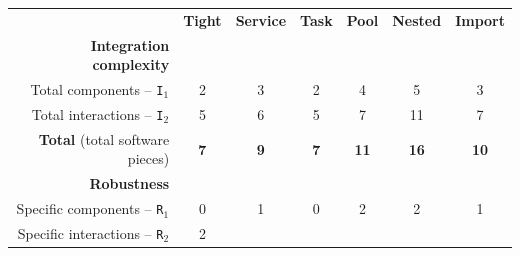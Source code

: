 \documentclass[preprint,3p,twocolumn]{elsarticle}
\begin{document}
\begin{table}
\footnotesize
\centering
\begin{tabular}{rcccccc}
                                     & \textbf{Tight}
                                     & \textbf{Service}
                                     & \textbf{Task}
                                     & \textbf{Pool}
                                     & \textbf{Nested}
                                     & \textbf{Import} \\
\cellcolor[HTML]{EEEEEE}\textbf{Integration complexity}& \multicolumn{6}{l}{\cellcolor[HTML]{EEEEEE}}\\
  Total components -- \texttt{I$_1$} & \cellcolor[HTML]{99FF99}2
                                     & \cellcolor[HTML]{99DD99}3
                                     & \cellcolor[HTML]{99FF99}2
                                     & \cellcolor[HTML]{99BB99}4
                                     & \cellcolor[HTML]{999999}5
                                     & \cellcolor[HTML]{99DD99}3\\
Total interactions -- \texttt{I$_2$} & \cellcolor[HTML]{99FF99}5
                                     & \cellcolor[HTML]{99EE99}6
                                     & \cellcolor[HTML]{99FF99}5
                                     & \cellcolor[HTML]{99DD99}7
                                     & \cellcolor[HTML]{999999}11
                                     & \cellcolor[HTML]{99DD99}7\\
\textbf{Total} (total software pieces) & \cellcolor[HTML]{99FF99}\textbf{7}
                                     & \cellcolor[HTML]{99E899}\textbf{9}
                                     & \cellcolor[HTML]{99FF99}\textbf{7}
                                     & \cellcolor[HTML]{99D299}\textbf{11}
                                     & \cellcolor[HTML]{999999}\textbf{16}
                                     & \cellcolor[HTML]{99DD99}\textbf{10}\\
\cellcolor[HTML]{EEEEEE}\textbf{Robustness}& \multicolumn{6}{l}{\cellcolor[HTML]{EEEEEE}}\\
Specific components -- \texttt{R$_1$} & \cellcolor[HTML]{99FF99}0
                                     & \cellcolor[HTML]{99CC99}1
                                     & \cellcolor[HTML]{99FF99}0
                                     & \cellcolor[HTML]{999999}2
                                     & \cellcolor[HTML]{999999}2
                                     & \cellcolor[HTML]{99CC99}1\\
  Specific interactions -- \texttt{R$_2$} & \cellcolor[HTML]{99EB99}2

\end{tabular}
\end{table}
\end{document}
